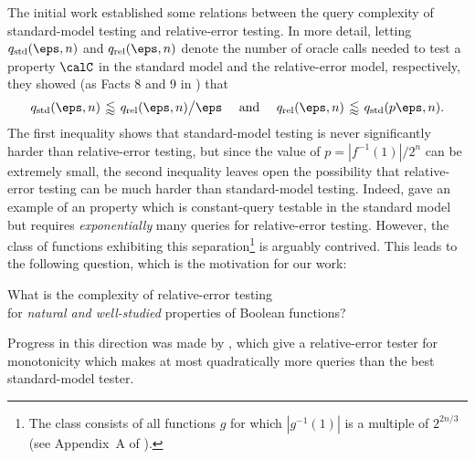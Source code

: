 \documentclass[11pt]{article}
\theoremstyle{definition}
\begin{document}
The initial work \cite{CDHLNSY2024}
established 
some 
relations between the query complexity of standard-model testing and relative-error testing.  In more detail, letting $q_\mathrm{std}(\eps,n)$ and $q_{\mathrm{rel}}(\eps,n)$ denote the number of oracle calls needed to test a property $\calC$ in the standard model and the relative-error model, respectively, they showed (as Facts 8 and 9 in \cite{CDHLNSY2024}) that 
\begin{equation}\label{eq:lastone}
q_{\mathrm{std}}(\eps,n) \hspace{0.04cm}\lessapprox\hspace{0.04cm}  {q_{\mathrm{rel}}(\eps,n)}\big/{\eps}\ \quad\text{and}\ \quad
q_{\mathrm{rel}}(\eps,n) \hspace{0.04cm} \lessapprox \hspace{0.04cm}q_{\mathrm{std}}(p\eps,n).
\end{equation}
The first inequality shows that standard-model testing is never significantly harder than relative-error testing, but since the value of $p=|f^{-1}(1)|/2^n$ can be extremely small, the second inequality leaves open the possibility that relative-error testing can be much harder than standard-model testing.  Indeed, \cite{CDHLNSY2024} gave an example of an property which is constant-query testable in the standard model but requires \emph{exponentially} many queries for relative-error testing. However, the class of functions exhibiting this separation\footnote{The class consists of all functions $g$ for which  $|g^{-1}(1)|$ is a multiple of $2^{2n/3}$ (see Appendix~A of \cite{CDHLNSY2024}).} is arguably contrived. 
This leads to the following question, which is the motivation for our work:  


\vspace{0.1cm}
\begin{center}
\begin{tcolorbox}[width=13cm]\centering
What is the complexity of relative-error testing \\for \emph{natural and well-studied} properties of Boolean functions?
\end{tcolorbox}
\end{center}\vspace{0.1cm}

Progress in this direction was made by \cite{CDHLNSY2024}, which give a relative-error tester for monotonicity which makes at most quadratically more queries than the best standard-model tester.\medskip 
\end{document}
